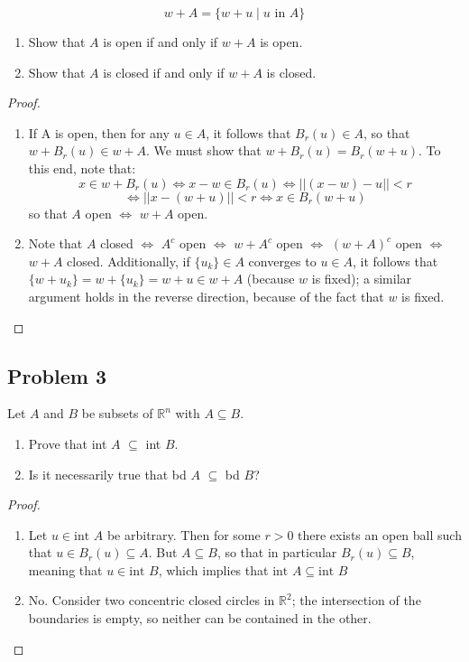 \documentclass{article}
\begin{document}
\[ w + A = \{w + u \mid u \text{ in } A\}\]

\begin{enumerate}[label=(\alph*)]
\item Show that $A$ is open if and only if $w+A$ is open.
\item Show that $A$ is closed if and only if $w+A$ is closed.
\end{enumerate}

\begin{proof}

\begin{enumerate}[label=(\alph*)]
\item If A is open, then for any $u \in A$, it follows that $B_r(u) \in A$, so that $w + B_r(u) \in w + A$. We must show that $w + B_r(u) = B_r(w+u)$. To this end, note that:
\[x \in w + B_r(u) \iff x-w \in B_r(u) \iff ||(x-w)-u|| < r \]
\[\iff ||x-(w+u)|| < r \iff x \in B_r(w+u)\]
so that $A$ open $\iff$ $w + A$ open.

\item Note that $A$ closed $\iff$ $A^c$ open $\iff$ $w + A^c$ open $\iff$ $(w + A)^c$ open $\iff$ $w + A$ closed. Additionally, if $\{u_k\} \in A$ converges to $u \in A$, it follows that $\{w + u_k\} = w + \{u_k\} = w + u \in w + A$ (because $w$ is fixed); a similar argument holds in the reverse direction, because of the fact that $w$ is fixed.
\end{enumerate}

\end{proof}

\subsection*{Problem 3}
Let $A$ and $B$ be subsets of $\mathbb{R}^n$ with $A \subseteq B$.
\begin{enumerate}[label=(\alph*)]
\item Prove that int $A$ $\subseteq$ int $B$.
\item Is it necessarily true that bd $A$ $\subseteq$ bd $B$?
\end{enumerate}


\begin{proof}
\begin{enumerate}[label=(\alph*)]
\item Let $u \in \text{int }A$ be arbitrary. Then for some $r > 0$ there exists an open ball such that $u \in B_r(u) \subseteq A $. But $A \subseteq B$, so that in particular $B_r(u) \subseteq B$, meaning that $u \in \text{int } B$, which implies that $\text{int }A \subseteq \text{int }B$
\item No. Consider two concentric closed circles in $\mathbb{R}^2$; the intersection of the boundaries is empty, so neither can be contained in the other. 
\end{enumerate}
\end{proof}
\end{document}
